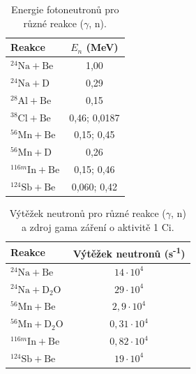\begin{table}[h!]
\centering
\caption{Energie fotoneutronů pro různé reakce ($\gamma$, n).}
\label{tab:fotoneutrony_energie}
\begin{tabular}{@{}lc@{}}
\toprule
\textbf{Reakce}       & \boldmath$E_n$ \textbf{(MeV)} \\ \midrule
$^{24}\text{Na} + \text{Be}$ & 1,00                         \\
$^{24}\text{Na} + \text{D}$  & 0,29                         \\
$^{28}\text{Al} + \text{Be}$ & 0,15                         \\
$^{38}\text{Cl} + \text{Be}$ & 0,46; 0,0187                 \\
$^{56}\text{Mn} + \text{Be}$ & 0,15; 0,45                   \\
$^{56}\text{Mn} + \text{D}$  & 0,26                         \\
$^{116m}\text{In} + \text{Be}$ & 0,15; 0,46                 \\
$^{124}\text{Sb} + \text{Be}$ & 0,060; 0,42                 \\ \bottomrule
\end{tabular}
\end{table}

\begin{table}[h!]
\centering
\begin{tabular}{@{}lc@{}}
\toprule
\textbf{Reakce}       & \textbf{Výtěžek neutronů (s\textsuperscript{-1})} \\ \midrule
$^{24}\text{Na} + \text{Be}$ & $14 \cdot 10^4$ \\
$^{24}\text{Na} + \text{D}_2\text{O}$  & $29 \cdot 10^4$ \\
$^{56}\text{Mn} + \text{Be}$ & $2,9 \cdot 10^4$ \\
$^{56}\text{Mn} + \text{D}_2\text{O}$  & $0,31 \cdot 10^4$ \\
$^{116m}\text{In} + \text{Be}$ & $0,82 \cdot 10^4$ \\
$^{124}\text{Sb} + \text{Be}$ & $19 \cdot 10^4$ \\ \bottomrule
\end{tabular}
\caption{Výtěžek neutronů pro různé reakce ($\gamma$, n) a zdroj gama záření o aktivitě 1 Ci.}
\label{tab:vytezky_neutronu}
\end{table}
